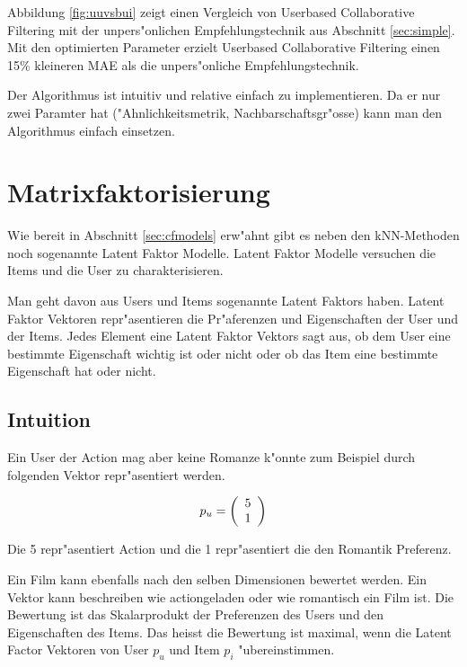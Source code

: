 \documentclass[a4paper, 12pt]{article}
\begin{document}
Abbildung \ref{fig:uuvsbui} zeigt einen Vergleich von Userbased Collaborative Filtering mit der unpers"onlichen Empfehlungstechnik aus Abschnitt \ref{sec:simple}. Mit den optimierten Parameter erzielt Userbased Collaborative Filtering einen 15\% kleineren MAE als die unpers"onliche Empfehlungstechnik.

Der Algorithmus ist intuitiv und relative einfach zu implementieren. Da er nur zwei Paramter hat ("Ahnlichkeitsmetrik, Nachbarschaftsgr"osse) kann man den Algorithmus einfach einsetzen. 

\section{Matrixfaktorisierung}
\label{sec:matrixfactorization}

Wie bereit in Abschnitt \ref{sec:cfmodels} erw"ahnt gibt es neben den kNN-Methoden noch sogenannte Latent Faktor Modelle. Latent Faktor Modelle versuchen die Items und die User zu charakterisieren. 

Man geht davon aus Users und Items sogenannte Latent Faktors haben. Latent Faktor Vektoren repr"asentieren die Pr"aferenzen und Eigenschaften der User und der Items. Jedes Element eine Latent Faktor Vektors sagt aus, ob dem User eine bestimmte Eigenschaft wichtig ist oder nicht oder ob das Item eine bestimmte Eigenschaft hat oder nicht. 


\subsection{Intuition}
\label{sec:intuition}

Ein User der Action mag aber keine Romanze k"onnte zum Beispiel durch folgenden Vektor repr"asentiert werden.

\begin{equation}
  \label{eq:vektor}
  p_u = \left(
  \begin{array}[c]{c}
    5 \\
    1 
  \end{array}
\right)
\end{equation}

Die 5 repr"asentiert Action und die 1 repr"asentiert die den Romantik Preferenz.

 Ein Film kann ebenfalls nach den selben Dimensionen bewertet werden. Ein Vektor kann beschreiben wie actiongeladen oder wie romantisch ein Film ist. Die Bewertung ist das Skalarprodukt der Preferenzen des Users und den Eigenschaften des Items. Das heisst die Bewertung ist maximal, wenn die Latent Factor Vektoren von User $p_u$ und Item $p_i$ "ubereinstimmen.
\end{document}
